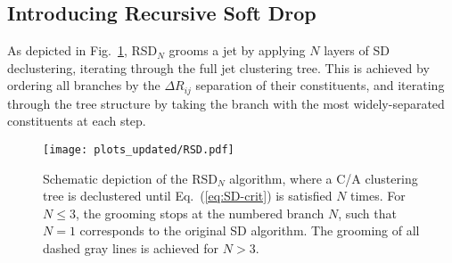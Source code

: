 \documentclass[11pt,a4paper]{article}
\DeclareRobustCommand{\Fig}[1]{Fig.~\ref{#1}}
\DeclareRobustCommand{\Eq}[1]{Eq.~(\ref{#1})}
\begin{document}
\subsection{Introducing Recursive Soft Drop}
\label{sec:recursive-SD}

As depicted in \Fig{fig:RSD}, RSD$_{N}$ grooms a jet by applying $N$ layers of SD declustering,
iterating through the full jet clustering tree.
%
This is achieved by ordering all branches by the $\Delta R_{ij}$
separation of their constituents, and iterating through the tree structure
by taking the branch with the most widely-separated constituents at
each step.

\begin{figure}[t]
  \centering
    \texttt{[image: plots\_updated/RSD.pdf]}%
  \caption{ Schematic depiction of the RSD$_N$ algorithm, where a C/A clustering tree is declustered until \Eq{eq:SD-crit} is satisfied $N$ times.  For $N \le 3$, the grooming stops at the numbered branch $N$, such that $N = 1$ corresponds to the original SD algorithm.  The grooming of all dashed gray lines is achieved for $N>3$.}
  \label{fig:RSD}
\end{figure}
\end{document}
